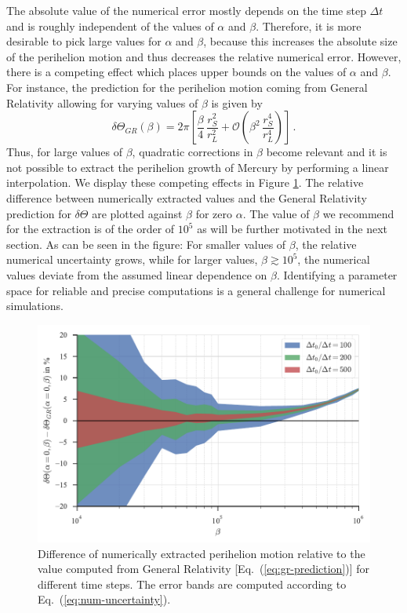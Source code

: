 \documentclass[12pt,ngerman,american]{iopart}
\begin{document}
The absolute value of the numerical error mostly depends on the time step $\Delta t$ and is roughly independent of the values of $\alpha$ and $\beta$.
Therefore, it is more desirable to pick large values for $\alpha$ and $\beta$, because this increases the absolute size of the perihelion
motion and thus decreases the relative numerical error.
However, there is a competing effect which places upper bounds on the values of $\alpha$ and $\beta$.
For instance, the prediction for the perihelion motion coming from General Relativity allowing for varying values of $\beta$ is given by
\begin{equation}\label{eq:gr-prediction}
	\delta \Theta_{GR} (\beta) =
	2 \pi \left[
	\frac{\beta}{4} \,\frac{r_S^2}{r_L^2}
	+\mathcal{O}\left(\beta^2\,\frac{r_S^4}{r_L^4}\right)
	\right]
	\, .
\end{equation}
Thus, for large values of $\beta$, quadratic corrections in $\beta$ become relevant and it is not possible to extract the
perihelion growth of Mercury by performing a linear interpolation.
We display these competing effects in Figure \ref{fcc4}.
The relative difference between numerically extracted values and the General Relativity prediction for $\delta \Theta$ are plotted against $\beta$ for zero $\alpha$.
The value of $\beta$ we recommend for the extraction is of the order of $10^5$ as will be further motivated in the next section.
As can be seen in the figure: For smaller values of $\beta$, the relative numerical uncertainty grows, while for larger
 values, $\beta \gtrsim 10^5$, the numerical values deviate from the assumed linear dependence on $\beta$.
Identifying a parameter space for reliable and precise computations is a general challenge for numerical simulations.
\begin{figure}[htb]
	\centering
	\includegraphics[width=.99\textwidth]{figs/computation-precision.pdf}
	\caption{\label{fcc4}Difference of numerically extracted perihelion motion relative to the value computed from General Relativity [Eq.~(\ref{eq:gr-prediction})] for different time steps.  The error bands are computed according to Eq.~(\ref{eq:num-uncertainty}).
}
\end{figure}
\end{document}
